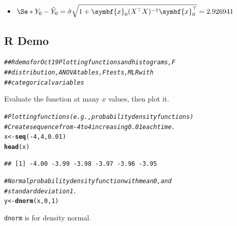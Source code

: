 \documentclass[oneside]{book}\usepackage[]{graphicx}\usepackage[dvipsnames,table,xcdraw]{xcolor}
\makeatletter
\newcommand{\hlnum}[1]{\textcolor[rgb]{0.686,0.059,0.569}{#1}}%
\newcommand{\hlcom}[1]{\textcolor[rgb]{0.678,0.584,0.686}{\textit{#1}}}%
\newcommand{\hlopt}[1]{\textcolor[rgb]{0,0,0}{#1}}%
\newcommand{\hlstd}[1]{\textcolor[rgb]{0.345,0.345,0.345}{#1}}%
\newcommand{\hlkwb}[1]{\textcolor[rgb]{0.69,0.353,0.396}{#1}}%
\newcommand{\hlkwd}[1]{\textcolor[rgb]{0.737,0.353,0.396}{\textbf{#1}}}%
\newenvironment{kframe}{%
 \def\at@end@of@kframe{}%
 \ifinner\ifhmode%
  \def\at@end@of@kframe{\end{minipage}}%
  \begin{minipage}{\columnwidth}%
 \fi\fi%
 \def\FrameCommand##1{\hskip\@totalleftmargin \hskip-\fboxsep
 \colorbox{shadecolor}{##1}\hskip-\fboxsep
     \hskip-\linewidth \hskip-\@totalleftmargin \hskip\columnwidth}%
 \MakeFramed {\advance\hsize-\width
   \@totalleftmargin\z@ \linewidth\hsize
   \@setminipage}}%
 {\par\unskip\endMakeFramed%
 \at@end@of@kframe}
\newenvironment{knitrout}{}{} %
\newcommand{\code}[1]{\texttt{#1}}
\makeatother
\begin{document}
\begin{itemize}
  \item $\Se*{Y_0-\hat{Y}_0}=\hat{\sigma}\sqrt{1+\symbf{x}_0(X^\top X)^{-1}\symbf{x}_0^\top}=2.926941$
\end{itemize}





\subsection{R Demo}
\begin{knitrout}
\color{fgcolor}\begin{kframe}
\begin{alltt}
\hlcom{## R demo for Oct 19 Plotting functions and histograms, F}
\hlcom{## distribution, ANOVA tables, F tests, MLR with}
\hlcom{## categorical variables}
\end{alltt}
\end{kframe}
\end{knitrout}
Evaluate the function at many $x$ values, then plot it.
\begin{knitrout}
\color{fgcolor}\begin{kframe}
\begin{alltt}
\hlcom{# Plotting functions (e.g., probability density functions)}
\hlcom{# Create sequence from -4 to 4 increasing 0.01 each time.}
\hlstd{x} \hlkwb{<-} \hlkwd{seq}\hlstd{(}\hlopt{-}\hlnum{4}\hlstd{,} \hlnum{4}\hlstd{,} \hlnum{0.01}\hlstd{)}
\hlkwd{head}\hlstd{(x)}
\end{alltt}
\begin{verbatim}
## [1] -4.00 -3.99 -3.98 -3.97 -3.96 -3.95
\end{verbatim}
\begin{alltt}
\hlcom{# Normal probability density function with mean 0, and}
\hlcom{# standard deviation 1.}
\hlstd{y} \hlkwb{<-} \hlkwd{dnorm}\hlstd{(x,} \hlnum{0}\hlstd{,} \hlnum{1}\hlstd{)}
\end{alltt}
\end{kframe}
\end{knitrout}

\code{dnorm} is for density normal.
\end{document}
